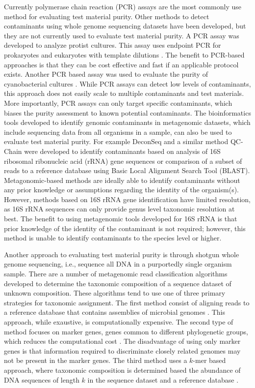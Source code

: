 \documentclass[fleqn,10pt,lineno]{wlpeerj}\usepackage[]{graphicx}\usepackage[]{color}
\begin{document}
Currently polymerase chain reaction (PCR) assays are the most commonly use method for evaluating test material purity. 
Other methods to detect contaminants using whole genome sequencing datasets have been developed, but they are not currently used to evaluate test material purity.
A PCR assay was developed to analyze protist cultures. 
This assay uses endpoint PCR for prokaryotes and eukaryotes with template dilutions \citep{Marron2013}. 
The benefit to PCR-based approaches is that they can be cost effective and fast if an applicable protocol exists. 
Another PCR based assay was used to evaluate the purity of cyanobacterial cultures \citep{heck2016evaluating}.
While PCR assays can detect low levels of contaminants, this approach does not easily scale to multiple contaminants and test materials. 
More importantly, PCR assays can only target specific contaminants, which biases the purity assessment to known potential contaminants.
The bioinformatics tools developed to identify genomic contaminants in metagenomic datasets, which include sequencing data from all organisms in a sample, can also be used to evaluate test material purity. 
For example DeconSeq \citep{Schmieder2011} and a similar method QC-Chain \citep{Zhou2013} were developed to identify contaminants based on analysis of 16S ribosomal ribonucleic acid (rRNA) gene sequences or comparison of a subset of reads to a reference database using Basic Local Alignment Search Tool (BLAST). 
Metagonomic-based methods are ideally able to identify contaminants without any prior knowledge or assumptions regarding the identity of the organism(s). 
However, methods based on 16S rRNA gene identification have limited resolution, as 16S rRNA sequences can only provide genus level taxonomic resolution at best. 
The benefit to using metagenomic tools developed for 16S rRNA is that prior knowledge of the identity of the contaminant is not required; however, this method is unable to identify contaminants to the species level or higher.   

Another approach to evaluating test material purity is through shotgun whole genome sequencing, i.e.,  sequence all DNA in a purportedly single organism sample. 
There are a number of metagenomic read classification algorithms developed to determine the taxonomic composition of a sequence dataset of unknown composition. 
These algorithms tend to use one of three primary strategies for taxonomic assignment. 
The first method consist of aligning reads to a reference database that contains assemblies of microbial genomes \citep{buchfink2015fast, Francis2013}. 
This approach, while exaustive, is computationally expensive. 
The second type of method focuses on marker genes, genes common to different phylogenetic groups, which reduces the computational cost \citep{segata2012metagenomic, liu2011accurate}. 
The disadvantage of using only marker genes is that information required to discriminate closely related genomes may not be present in the marker genes.
The third method uses a $k$-mer based approach, where taxonomic composition is determined based the abundance of DNA sequences of length $k$ in the sequence dataset and a reference database \citep{ounit2015clark, menzel2016fast, wood2014kraken}. 
\end{document}
